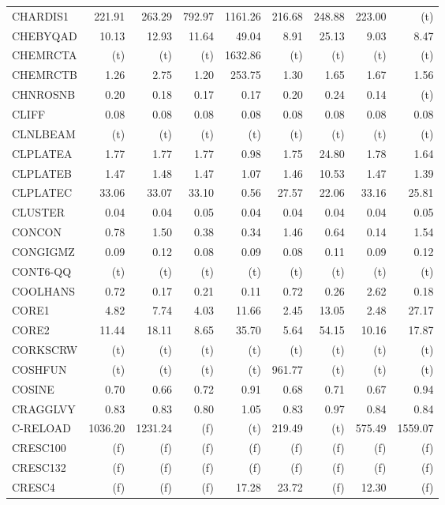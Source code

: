 \documentclass[11pt,twoside]{article}
\begin{document}
{\begin{longtable}[c]{|l|r|r|r|r|r|r|r|r|}
CHARDIS1 & 221.91 & 263.29 & 792.97 & 1161.26 & 216.68 & 248.88 & 223.00 & (t) \\
CHEBYQAD & 10.13 & 12.93 & 11.64 & 49.04 & 8.91 & 25.13 & 9.03 & 8.47 \\
CHEMRCTA & (t) & (t) & (t) & 1632.86 & (t) & (t) & (t) & (t) \\
CHEMRCTB & 1.26 & 2.75 & 1.20 & 253.75 & 1.30 & 1.65 & 1.67 & 1.56 \\
CHNROSNB & 0.20 & 0.18 & 0.17 & 0.17 & 0.20 & 0.24 & 0.14 & (t) \\
CLIFF & 0.08 & 0.08 & 0.08 & 0.08 & 0.08 & 0.08 & 0.08 & 0.08 \\
CLNLBEAM & (t) & (t) & (t) & (t) & (t) & (t) & (t) & (t) \\
CLPLATEA & 1.77 & 1.77 & 1.77 & 0.98 & 1.75 & 24.80 & 1.78 & 1.64 \\
CLPLATEB & 1.47 & 1.48 & 1.47 & 1.07 & 1.46 & 10.53 & 1.47 & 1.39 \\
CLPLATEC & 33.06 & 33.07 & 33.10 & 0.56 & 27.57 & 22.06 & 33.16 & 25.81 \\
CLUSTER & 0.04 & 0.04 & 0.05 & 0.04 & 0.04 & 0.04 & 0.04 & 0.05 \\
CONCON & 0.78 & 1.50 & 0.38 & 0.34 & 1.46 & 0.64 & 0.14 & 1.54 \\
CONGIGMZ & 0.09 & 0.12 & 0.08 & 0.09 & 0.08 & 0.11 & 0.09 & 0.12 \\
CONT6-QQ & (t) & (t) & (t) & (t) & (t) & (t) & (t) & (t) \\
COOLHANS & 0.72 & 0.17 & 0.21 & 0.11 & 0.72 & 0.26 & 2.62 & 0.18 \\
CORE1 & 4.82 & 7.74 & 4.03 & 11.66 & 2.45 & 13.05 & 2.48 & 27.17 \\
CORE2 & 11.44 & 18.11 & 8.65 & 35.70 & 5.64 & 54.15 & 10.16 & 17.87 \\
CORKSCRW & (t) & (t) & (t) & (t) & (t) & (t) & (t) & (t) \\
COSHFUN & (t) & (t) & (t) & (t) & 961.77 & (t) & (t) & (t) \\
COSINE & 0.70 & 0.66 & 0.72 & 0.91 & 0.68 & 0.71 & 0.67 & 0.94 \\
CRAGGLVY & 0.83 & 0.83 & 0.80 & 1.05 & 0.83 & 0.97 & 0.84 & 0.84 \\
C-RELOAD & 1036.20 & 1231.24 & (f) & (t) & 219.49 & (t) & 575.49 & 1559.07 \\
CRESC100 & (f) & (f) & (f) & (f) & (f) & (f) & (f) & (f) \\
CRESC132 & (f) & (f) & (f) & (f) & (f) & (f) & (f) & (f) \\
CRESC4 & (f) & (f) & (f) & 17.28 & 23.72 & (f) & 12.30 & (f) \\

\end{longtable}}
\end{document}
